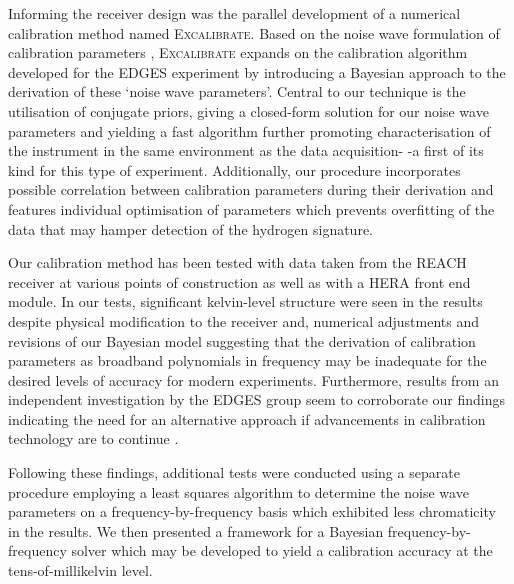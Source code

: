 Informing the receiver design was the parallel development of a numerical calibration method named \textsc{Excalibrate}. Based on the noise wave formulation of calibration parameters \citep{meys}, \textsc{Excalibrate} expands on the calibration algorithm developed for the EDGES experiment \citep{edgesCal} by introducing a Bayesian approach to the derivation of these ‘noise wave parameters’. Central to our technique is the utilisation of conjugate priors, giving a closed-form solution for our noise wave parameters and yielding a fast algorithm further promoting characterisation of the instrument in the same environment as the data acquisition- -a first of its kind for this type of experiment. Additionally, our procedure incorporates possible correlation between calibration parameters during their derivation and features individual optimisation of parameters which prevents overfitting of the data that may hamper detection of the hydrogen signature.

Our calibration method has been tested with data taken from the REACH receiver at various points of construction as well as with a HERA front end module. In our tests, significant kelvin-level structure were seen in the results despite physical modification to the receiver and, numerical adjustments and revisions of our Bayesian model suggesting that the derivation of calibration parameters as broadband polynomials in frequency may be inadequate for the desired levels of accuracy for modern experiments. Furthermore, results from an independent investigation by the EDGES group seem to corroborate our findings indicating the need for an alternative approach if advancements in calibration technology are to continue \citep{murray_calpap}.

Following these findings, additional tests were conducted using a separate procedure employing a least squares algorithm to determine the noise wave parameters on a frequency-by-frequency basis which exhibited less chromaticity in the results. We then presented a framework for a Bayesian frequency-by-frequency solver which may be developed to yield a calibration accuracy at the tens-of-millikelvin level.


